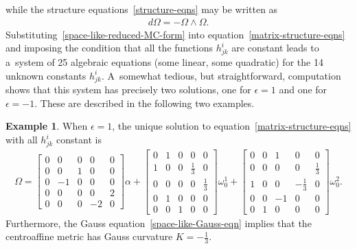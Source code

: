 \documentclass[10pt,a4paper]{amsart}
\numberwithin{equation}{section}
\theoremstyle{definition}
\newtheorem{exmpl}[teo]{Example}
\begin{document}
while the structure equations~\eqref{structure-eqns} may be written as
\begin{gather}
d\Omega = - \Omega \wedge \Omega.
\label{matrix-structure-eqns}
\end{gather}
Substituting~\eqref{space-like-reduced-MC-form} into equation~\eqref{matrix-structure-eqns} and imposing the condition
that all the functions $h^i_{jk}$ are constant leads to a~system of 25 algebraic equations (some linear, some quadratic)
for the 14 unknown constants $h^i_{jk}$.
A~somewhat tedious, but straightforward, computation shows that this system has precisely two solutions, one for
$\epsilon=1$ and one for $\epsilon=-1$.
These are described in the following two examples.

\begin{exmpl}
\label{space-like-epsilon-plus-one}
When $\epsilon=1$, the unique solution to equation~\eqref{matrix-structure-eqns} with all $h^i_{jk}$ constant is
\begin{gather}
\Omega =
\begin{bmatrix}
0 & 0 & 0 & 0 & 0
\\
0 & 0 & 1 & 0 & 0
\\
0 & -1 & 0 & 0 & 0
\\
0 & 0 & 0 & 0 & 2
\\
0 & 0 & 0 & -2 & 0
\end{bmatrix}
\alpha +
\begin{bmatrix}
0 & 1 & 0 & 0 & 0
\\
1 & 0 & 0 & \tfrac{1}{3} & 0
\\
0 & 0 & 0 & 0 & \tfrac{1}{3}
\\
0 & 1 & 0 & 0 & 0
\\
0 & 0 & 1 & 0 & 0
\end{bmatrix}
\omega^1_0 +
\begin{bmatrix}
0 & 0 & 1 & 0 & 0
\\
0 & 0 & 0 & 0 & \tfrac{1}{3}
\\
1 & 0 & 0 & -\tfrac{1}{3} & 0
\\
0 & 0 & -1 & 0 & 0
\\
0 & 1 & 0 & 0 & 0
\end{bmatrix}
\omega^2_0.
\label{space-like-epsilon-plus-one-MC-form}
\end{gather}
Furthermore, the Gauss equation~\eqref{space-like-Gauss-eqn} implies that the centroaf\/f\/ine metric has Gauss curvature $K
= -\tfrac{1}{3}$.


\end{exmpl}
\end{document}
